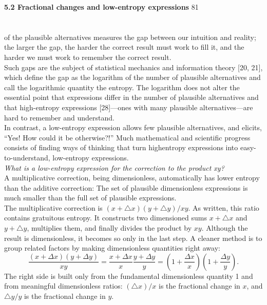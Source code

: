 \documentclass{book}
\begin{document}
\pagestyle{fancy} 
\renewcommand{\headrulewidth}{0pt}
\fancyhf{}
\textbf{5.2 Fractional changes and low-entropy expressions} \hfill{81}\\
\\
\\
\large{of the plausible alternatives measures the gap between our intuition and
reality; the larger the gap, the harder the correct result must work to fill
it, and the harder we must work to remember the correct result.
\\

Such gaps are the subject of statistical mechanics and information theory
[20, 21], which define the gap as the logarithm of the number of plausible
alternatives and call the logarithmic quantity the entropy. The logarithm
does not alter the essential point that expressions differ in the number of
plausible alternatives and that high-entropy expressions [28]—ones with
many plausible alternatives—are hard to remember and understand.
\\

In contrast, a low-entropy expression allows few plausible alternatives,
and elicits, “Yes! How could it be otherwise?!” Much mathematical and
scientific progress consists of finding ways of thinking that turn highentropy
expressions into easy-to-understand, low-entropy expressions.}
\\

\textit{What is a low-entropy expression for the correction to the product xy?}
\\

\large{A multiplicative correction, being dimensionless, automatically has lower
entropy than the additive correction: The set of plausible dimensionless
expressions is much smaller than the full set of plausible expressions.
\\

The multiplicative correction is $(x + \triangle x )(y + \triangle y)/xy$. As written, this
ratio contains gratuitous entropy. It constructs two dimensioned sums $x + \triangle x$ and $y + \triangle y$, multiplies them, and finally divides the product by $xy$. Although the result is dimensionless, it becomes so only in the last step.
A cleaner method is to group related factors by making dimensionless
quantities right away:}
\begin{equation}
\frac{(x+\Delta x)(y+\Delta y)}{xy}=\frac{x+\Delta x}{x}\frac{y+\Delta y}{y}=(1+\frac{\Delta x}{x})(1+\frac{\Delta y}{y}).
\end{equation}
\large{The right side is built only from the fundamental dimensionless quantity 1
and from meaningful dimensionless ratios: $(\triangle x) / x$ is the fractional change
in $x$, and $\triangle y / y$ is the fractional change in $y$.}
\\
\end{document}
